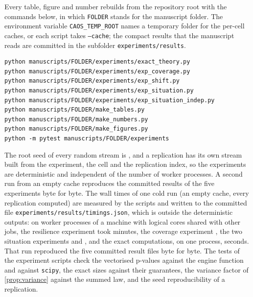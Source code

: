 Every table, figure and number rebuilds from the repository root with the commands below, in which \texttt{FOLDER} stands for the manuscript folder. The environment variable \texttt{CAOS\_TEMP\_ROOT} names a temporary folder for the per-cell caches, or each script takes \texttt{--cache}; the compact results that the manuscript reads are committed in the subfolder \texttt{experiments/results}.
\begin{verbatim}
python manuscripts/FOLDER/experiments/exact_theory.py
python manuscripts/FOLDER/experiments/exp_coverage.py
python manuscripts/FOLDER/experiments/exp_shift.py
python manuscripts/FOLDER/experiments/exp_situation.py
python manuscripts/FOLDER/experiments/exp_situation_indep.py
python manuscripts/FOLDER/make_tables.py
python manuscripts/FOLDER/make_numbers.py
python manuscripts/FOLDER/make_figures.py
python -m pytest manuscripts/FOLDER/experiments
\end{verbatim}
The root seed of every random stream is \RootSeed{}, and a replication has its own stream built from the experiment, the cell and the replication index, so the experiments are deterministic and independent of the number of worker processes. A second run from an empty cache reproduces the committed results of the five experiments byte for byte. The wall times of one cold run (an empty cache, every replication computed) are measured by the scripts and written to the committed file \texttt{experiments/results/timings.json}, which is outside the deterministic outputs: on \TimeWorkers{} worker processes of a machine with \TimeCpus{} logical cores shared with other jobs, the resilience experiment took \TimeShiftMin{} minutes, the coverage experiment \TimeCovMin{}, the two situation experiments \TimeSitMin{} and \TimeSitInMin{}, and the exact computations, on one process, \TimeExactSec{} seconds. That run reproduced the five committed result files byte for byte. The tests of the experiment scripts check the vectorised p-values against the engine function and against \texttt{scipy}, the exact sizes against their guarantees, the variance factor of \cref{prop:variance} against the summed law, and the seed reproducibility of a replication.

